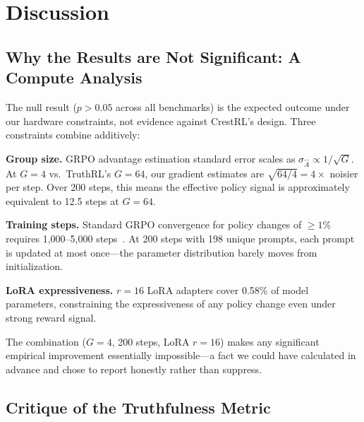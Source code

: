 \documentclass[11pt]{article}
\begin{document}
\section{Discussion}
\label{sec:discussion}

\subsection{Why the Results are Not Significant: A Compute Analysis}

The null result ($p>0.05$ across all benchmarks) is the expected outcome under our hardware constraints, not evidence against CrestRL's design. Three constraints combine additively:

\textbf{Group size.} GRPO advantage estimation standard error scales as $\sigma_{\hat{A}} \propto 1/\sqrt{G}$. At $G=4$ vs.\ TruthRL's $G=64$, our gradient estimates are $\sqrt{64/4} = 4\times$ noisier per step. Over 200 steps, this means the effective policy signal is approximately equivalent to 12.5 steps at $G=64$.

\textbf{Training steps.} Standard GRPO convergence for policy changes of $\geq1\%$ requires 1{,}000--5{,}000 steps~\cite{deepseek2024grpo}. At 200 steps with 198 unique prompts, each prompt is updated at most once---the parameter distribution barely moves from initialization.

\textbf{LoRA expressiveness.} $r=16$ LoRA adapters cover 0.58\% of model parameters, constraining the expressiveness of any policy change even under strong reward signal.

The combination ($G=4$, 200 steps, LoRA $r=16$) makes any significant empirical improvement essentially impossible---a fact we could have calculated in advance and chose to report honestly rather than suppress.

\subsection{Critique of the Truthfulness Metric}
\label{sec:metric-critique}
\end{document}

